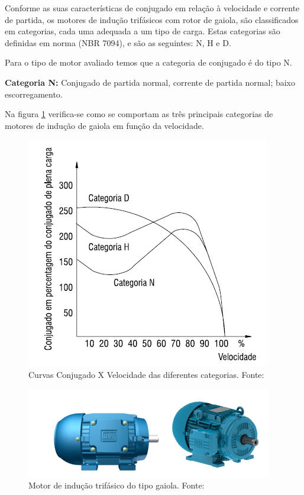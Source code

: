 Conforme as suas características de conjugado em relação à velocidade e corrente de partida, os motores de indução trifásicos 
com rotor de gaiola, são classificados em categorias, cada uma adequada a um tipo de carga. Estas categorias são definidas em 
norma (NBR 7094), e são as seguintes: N, H e D.\cite{WEG_catalogo}

Para o tipo de motor avaliado temos que a categoria de conjugado é do tipo N. \cite{WEG_catalogo}

\textbf{Categoria N:} Conjugado de partida normal, corrente de partida normal; baixo escorregamento.\cite{WEG_catalogo}

Na figura \ref{fig:conjugado_N} verifica-se como se comportam as três principais categorias de motores de indução de 
gaiola em função da velocidade.

\begin{figure}[H]
\centering
\includegraphics[scale=0.8]{figuras/conjugado_N.png}
\caption{Curvas Conjugado X Velocidade das diferentes categorias. Fonte:\cite{WEG_catalogo}}
\label{fig:conjugado_N}
\end{figure}

\begin{figure}[H]
\centering
\includegraphics[scale=0.8]{figuras/motorgaiola.png}
\caption{Motor de indução trifásico do tipo gaiola. Fonte:\cite{WEG_catalogo}}
\label{fig:motorgaiola}
\end{figure}

